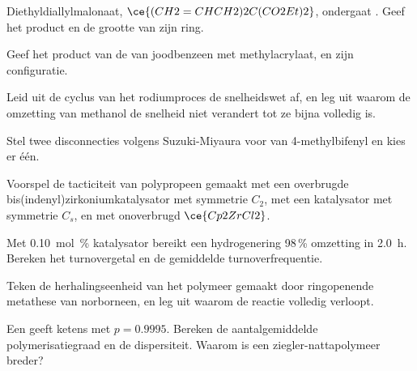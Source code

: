 \begin{exercise}[$\star$]\label{exo:b3:homogeneous-catalysis:3}
Diethyldiallylmalonaat, $\ce{(CH2=CHCH2)2C(CO2Et)2}$, ondergaat .
Geef het product en de grootte van zijn ring.
\end{exercise}

\begin{exercise}[$\star$]\label{exo:b3:homogeneous-catalysis:4}
Geef het product van de  van joodbenzeen met methylacrylaat,
en zijn configuratie.
\end{exercise}

\begin{exercise}[$\star\star$]\label{exo:b3:homogeneous-catalysis:5}
Leid uit de cyclus van het rodiumproces de snelheidswet af, en leg uit
waarom de omzetting van methanol de snelheid niet verandert tot ze bijna
volledig is.
\end{exercise}

\begin{exercise}[$\star\star$]\label{exo:b3:homogeneous-catalysis:6}
Stel twee disconnecties volgens Suzuki-Miyaura voor van
4-methylbifenyl en kies er één.
\end{exercise}

\begin{exercise}[$\star\star$]\label{exo:b3:homogeneous-catalysis:7}
Voorspel de tacticiteit van polypropeen gemaakt met een overbrugde
bis(indenyl)zirkoniumkatalysator met symmetrie $C_2$, met een katalysator met symmetrie $C_s$, en met onoverbrugd $\ce{Cp2ZrCl2}$.
\end{exercise}

\begin{exercise}[$\star\star$]\label{exo:b3:homogeneous-catalysis:8}
Met \qty{0.10}{mol\%} katalysator bereikt een hydrogenering 98\,\% omzetting in \qty{2.0}{h}.
Bereken het turnovergetal en de gemiddelde turnoverfrequentie.
\end{exercise}

\begin{exercise}[$\star\star$]\label{exo:b3:homogeneous-catalysis:9}
Teken de herhalingseenheid van het polymeer gemaakt door ringopenende
metathese van norborneen, en leg uit waarom de reactie volledig
verloopt.
\end{exercise}

\begin{exercise}[$\star\star\star$]\label{exo:b3:homogeneous-catalysis:10}
Een  geeft ketens met $p = 0.9995$. Bereken de
aantalgemiddelde polymerisatiegraad en de dispersiteit. Waarom is een
ziegler-nattapolymeer
breder?
\end{exercise}

